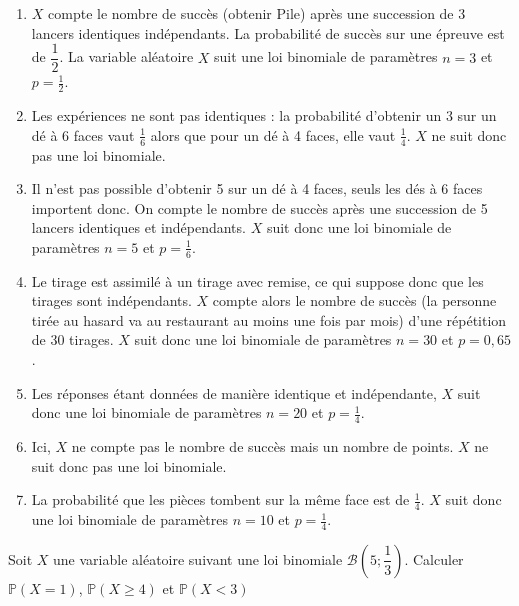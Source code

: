 \documentclass[11pt,fleqn, openany]{book} %
\begin{document}
\begin{solution}\hspace{0pt}
\begin{enumerate}
\item $X$ compte le nombre de succès (obtenir Pile) après une succession de 3 lancers identiques indépendants. La probabilité de succès sur une épreuve est de $\dfrac{1}{2}$. La variable aléatoire $X$ suit une loi binomiale de paramètres $n=3$ et $p=\frac{1}{2}$.
\item Les expériences ne sont pas identiques : la probabilité d'obtenir un 3 sur un dé à 6 faces vaut $\frac{1}{6}$ alors que pour un dé à 4 faces, elle vaut $\frac{1}{4}$. $X$ ne suit donc pas une loi binomiale.
\item Il n'est pas possible d'obtenir 5 sur un dé à 4 faces, seuls les dés à 6 faces importent donc. On compte le nombre de succès après une succession de 5 lancers identiques et indépendants. $X$ suit donc une loi binomiale de paramètres $n=5$ et $p=\frac{1}{6}$.
\item Le tirage est assimilé à un tirage avec remise, ce qui suppose donc que les tirages sont indépendants. $X$ compte alors le nombre de succès (la personne tirée au hasard va au restaurant au moins une fois par mois) d'une répétition de 30 tirages. $X$ suit donc une loi binomiale de paramètres $n=30$ et $p=0,65$.
\item Les réponses étant données de manière identique et indépendante, $X$ suit donc une loi binomiale de paramètres $n=20$ et $p=\frac{1}{4}$.
\item Ici, $X$ ne compte pas le nombre de succès mais un nombre de points. $X$ ne suit donc pas une loi binomiale.
\item La probabilité que les pièces tombent sur la même face est de $\frac{1}{4}$. $X$ suit donc une loi binomiale de paramètres $n=10$ et $p=\frac{1}{4}$.
\end{enumerate}

\end{solution}


\begin{exercise}[topic=prob12]Soit $X$ une variable aléatoire suivant une loi binomiale $\mathcal{B}\left(5;\dfrac{1}{3}\right)$. Calculer $\mathbb{P}(X=1)$,  $\mathbb{P}(X \geqslant 4)$ et $\mathbb{P}(X<3)$\end{exercise}
\end{document}
